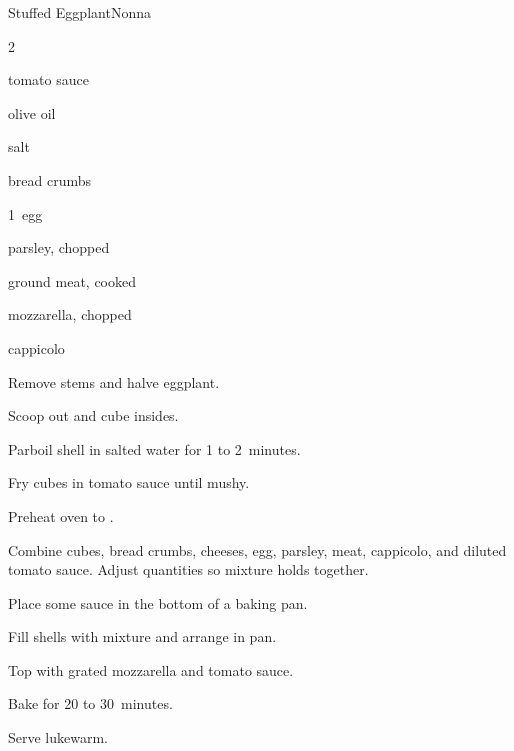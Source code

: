 \begin{recipe}{Stuffed Eggplant}{Nonna}{}

\begin{ingredients}
\item 2~
\item tomato sauce
\item olive oil
\item salt
\item bread crumbs
\item {}
\item 1~egg
\item parsley, chopped
\item ground meat, cooked
\item mozzarella, chopped
\item cappicolo
\end{ingredients}

\begin{directions}
\item Remove stems and halve eggplant.
\item Scoop out and cube insides.
\item Parboil shell in salted water for 1 to 2~minutes.
\item Fry cubes in tomato sauce until mushy.
\item Preheat oven to .
\item Combine cubes, bread crumbs, cheeses, egg, parsley, meat, cappicolo, and diluted tomato sauce. Adjust quantities so mixture holds together.
\item Place some sauce in the bottom of a baking pan.
\item Fill shells with mixture and arrange in pan.
\item Top with grated mozzarella and tomato sauce.
\item Bake for 20 to 30~minutes.
\item Serve lukewarm.
\end{directions}

\hint{}
\end{recipe}
